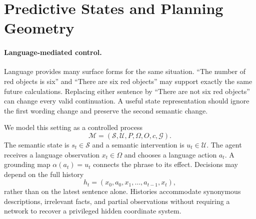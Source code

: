 \section{Predictive States and Planning Geometry}
\label{sec:framework}
\label{sec:method}

\paragraph{Language-mediated control.}
Language provides many surface forms for the same situation. ``The number of red objects is six'' and ``There are six red objects'' may support exactly the same future calculations. Replacing either sentence by ``There are not six red objects'' can change every valid continuation. A useful state representation should ignore the first wording change and preserve the second semantic change.

We model this setting as a controlled process
\begin{equation}
    \mathcal{M}=(\mathcal{S},\mathcal{U},P,\Omega,O,c,\mathcal{G}).
\end{equation}
The semantic state is $s_t\in\mathcal{S}$ and a semantic intervention is $u_t\in\mathcal{U}$. The agent receives a language observation $x_t\in\Omega$ and chooses a language action $a_t$. A grounding map $\alpha(a_t)=u_t$ connects the phrase to its effect. Decisions may depend on the full history
\begin{equation}
    h_t=(x_0,a_0,x_1,\ldots,a_{t-1},x_t),
\end{equation}
rather than on the latest sentence alone. Histories accommodate synonymous descriptions, irrelevant facts, and partial observations without requiring a network to recover a privileged hidden coordinate system.


